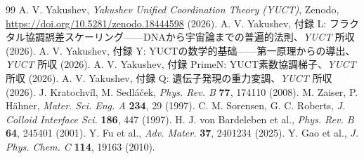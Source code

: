 \documentclass[11pt,a4paper]{article}
\begin{document}
	\begin{thebibliography}{99}
		A. V. Yakushev, \emph{Yakushev Unified Coordination Theory (YUCT)}, Zenodo, \url{https://doi.org/10.5281/zenodo.18444598} (2026).
		A. V. Yakushev, 付録 L: フラクタル協調誤差スケーリング——DNAから宇宙論までの普遍的法則、\emph{YUCT} 所収 (2026).
		A. V. Yakushev, 付録 Y: YUCTの数学的基础——第一原理からの導出、\emph{YUCT} 所収 (2026).
		A. V. Yakushev, 付録 PrimeN: YUCT素数協調梯子、\emph{YUCT} 所収 (2026).
		A. V. Yakushev, 付録 Q: 遺伝子発現の重力変調、\emph{YUCT} 所収 (2026).
		J. Kratochv\'il, M. Sedl\'a\v{c}ek, \emph{Phys. Rev. B} \textbf{77}, 174110 (2008).
		M. Zaiser, P. H\"ahner, \emph{Mater. Sci. Eng. A} \textbf{234}, 29 (1997).
		C. M. Sorensen, G. C. Roberts, \emph{J. Colloid Interface Sci.} \textbf{186}, 447 (1997).
		H. J. von Bardeleben et al., \emph{Phys. Rev. B} \textbf{64}, 245401 (2001).
		Y. Fu et al., \emph{Adv. Mater.} \textbf{37}, 2401234 (2025).
		Y. Gao et al., \emph{J. Phys. Chem. C} \textbf{114}, 19163 (2010).
	\end{thebibliography}
	
\end{document}
